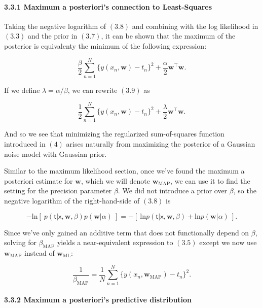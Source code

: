 \documentclass[
  0.875em,
  letterpaper,
  DIV=11,
  numbers=noendperiod]{scrartcl}
\let\oldparagraph\paragraph
\renewcommand{\paragraph}[1]{\oldparagraph{#1}\mbox{}}
\begin{document}
\hypertarget{maximum-a-posterioris-connection-to-least-squares}{%
\paragraph{\texorpdfstring{\textbf{3.3.1 Maximum a posteriori's
connection to
Least-Squares}}{3.3.1 Maximum a posteriori's connection to Least-Squares}}\label{maximum-a-posterioris-connection-to-least-squares}}

Taking the negative logarithm of \((3.8)\) and combining with the log
likelihood in \((3.3)\) and the prior in \((3.7)\), it can be shown that
the maximum of the posterior is equivalenty the minimum of the following
expression:

\[
\frac{\beta}{2} \sum_{n=1}^N \{y(x_n, \mathbf{w}) - t_n \}^2 + \frac{\alpha}{2} \mathbf{w}^\intercal \mathbf{w}. \tag{3.9}
\]

If we define \(\lambda = \alpha / \beta\), we can rewrite \((3.9)\) as

\[
\frac{1}{2} \sum_{n=1}^N \{y(x_n, \mathbf{w}) - t_n \}^2 + \frac{\lambda}{2} \mathbf{w}^\intercal \mathbf{w}. \tag{3.10}
\]

And so we see that minimizing the regularized sum-of-squares function
introduced in \((4)\) arises naturally from maximizing the posterior of
a Gaussian noise model with Gaussian prior.

Similar to the maximum likelihood section, once we've found the maximum
a posteriori estimate for \(\mathbf{w}\), which we will denote
\(\mathbf{w}_{\text{MAP}}\), we can use it to find the setting for the
precision parameter \(\beta\). We did not introduce a prior over
\(\beta\), so the negative logarithm of the right-hand-side of \((3.8)\)
is

\[
-\text{ln} \left[ \: p(\pmb{\mathsf{t}}|\pmb{\mathsf{x}}, \mathbf{w}, \beta) p(\mathbf{w}|\alpha)  \: \right] = -[ \: \text{ln}p(\pmb{\mathsf{t}}|\pmb{\mathsf{x}}, \mathbf{w}, \beta) + \text{ln} p(\mathbf{w}|\alpha) \: ]. \tag{3.11}
\]

Since we've only gained an additive term that does not functionally
depend on \(\beta\), solving for \(\beta_{\text{MAP}}\) yields a
near-equivalent expression to \((3.5)\) except we now use
\(\mathbf{w}_{\text{MAP}}\) instead of \(\mathbf{w}_{\text{ML}}\):

\[ 
\frac{1}{\beta_{\text{MAP}}} = \frac{1}{N} \sum_{n=1}^{N} \{y(x_n, \mathbf{w}_{\text{MAP}}) - t_n\}^2. \tag{3.12}
\]

\hypertarget{maximum-a-posterioris-predictive-distribution}{%
\paragraph{\texorpdfstring{\textbf{3.3.2 Maximum a posteriori's
predictive
distribution}}{3.3.2 Maximum a posteriori's predictive distribution}}\label{maximum-a-posterioris-predictive-distribution}}
\end{document}
